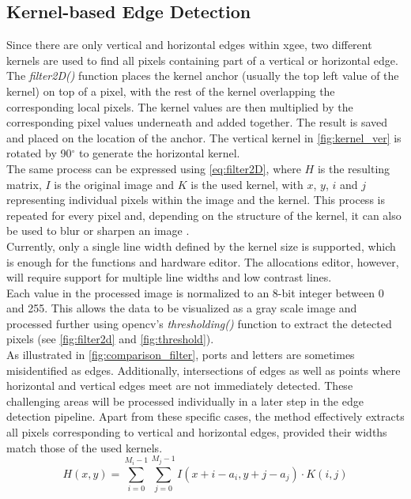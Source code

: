 \subsection{Kernel-based Edge Detection}
\label{sec:kernel_edge_detection}
Since there are only vertical and horizontal edges within \acrshort{xgee}, two different kernels are used to find all pixels containing part of a vertical or horizontal edge. The \textit{filter2D()} function places the kernel anchor (usually the top left value of the kernel) on top of a pixel, with the rest of the kernel overlapping the corresponding local pixels. The kernel values are then multiplied by the corresponding pixel values underneath and added together. The result is saved and placed on the location of the anchor. The vertical kernel in \autoref{fig:kernel_ver} is rotated by 90$^{\circ}$ to generate the horizontal kernel.\\
The same process can be expressed using \autoref{eq:filter2D}, where $H$ is the resulting matrix, $I$ is the original image and $K$ is the used kernel, with $x$, $y$, $i$ and $j$ representing individual pixels within the image and the kernel. This process is repeated for every pixel and, depending on the structure of the kernel, it can also be used to blur or sharpen an image \cite{opencv_filter2d_2024}.\\
Currently, only a single line width defined by the kernel size is supported, which is enough for the functions and hardware editor. The allocations editor, however, will require support for multiple line widths and low contrast lines.\\
Each value in the processed image is normalized to an 8-bit integer between 0 and 255. This allows the data to be visualized as a gray scale image and processed further using \acrshort{opencv}'s \textit{thresholding()} function to extract the detected pixels (see \autoref{fig:filter2d} and \ref{fig:threshold}).\\
As illustrated in \autoref{fig:comparison_filter}, ports and letters are sometimes misidentified as edges. Additionally, intersections of edges as well as points where horizontal and vertical edges meet are not immediately detected. These challenging areas will be processed individually in a later step in the edge detection pipeline. Apart from these specific cases, the method effectively extracts all pixels corresponding to vertical and horizontal edges, provided their widths match those of the used kernels.
\begin{equation}
\label{eq:filter2D}
    H(x, y) = \sum_{i=0}^{M_i-1} \sum_{j=0}^{M_j-1} I(x + i - a_i,y + j - a_j) \cdot K(i, j)
\end{equation}

